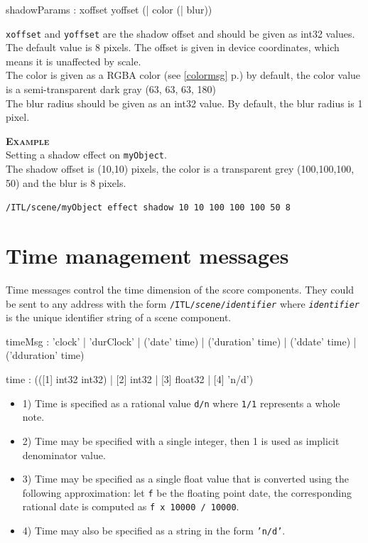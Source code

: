 \documentclass[a4paper,twoside]{report}
\newcommand{\toplevel}[1]	{\chapter{#1}}
\newcommand{\fullref}[1]	{\ref{#1} p.\pageref{#1}}
\newcommand{\OSC}[1]		{\texttt{#1}}
\newcommand{\values}[1]	{\texttt{#1}}
\newcommand{\example}		{\textbf{\hspace{-1.5cm}\textbf{\textsc{Example }}}}
\newcommand{\sample}	[1]			{\vspace{-2mm}\begin{center}\colorbox{mygrey}{
								\begin{minipage}[t]{0.9\columnwidth} 
								{\small \texttt{#1}}
								\end{minipage}}\end{center}}
\begin{document}
\begin{rail}
shadowParams : xoffset yoffset (| color (| blur))
\end{rail}

\OSC{xoffset} and \OSC{yoffset} are the shadow offset and should be given as int32 values. The default value is 8 pixels. The offset is given in device coordinates, which means it is unaffected by scale. \\
The color is given as a RGBA color (see \fullref{colormsg}) by default, the color value is a semi-transparent dark gray (63, 63, 63, 180) \\
The blur radius should be given as an int32 value. By default, the blur radius is 1 pixel.

\example \\
Setting a shadow effect on \OSC{myObject}. \\
The shadow offset is (10,10) pixels, the color is a transparent grey (100,100,100, 50) and the blur is 8 pixels.
\sample{/ITL/scene/myObject effect shadow 10 10 100 100 100 50 8}


\toplevel{Time management messages}
\label{time}
Time messages control the time dimension of the score components. They could be sent to any address with the form \OSC{/ITL/\textit{scene}/\textit{identifier}} where \OSC{\textit{identifier}} is the unique identifier string of a scene component.
\begin{rail}
timeMsg : 'clock'
		| 'durClock' 
		| ('date' time)
		| ('duration' time) 
		| ('ddate' time) 
		| ('dduration' time) 
\end{rail}

\begin{rail}
time : (([1] int32 int32) | [2] int32 | [3] float32 | [4] 'n/d')
\end{rail}

\begin{itemize}
\item 1) Time is specified as a rational value \values{d/n} where \values{1/1} represents a whole note. 
\item 2) Time may be specified with a single integer, then 1 is used as implicit denominator value.
\item 3) Time may be specified as a single float value that is converted using the following approximation: let \values{f} be the floating point date, the corresponding rational date is computed as \values{f x 10000 / 10000}.
\item 4) Time may also be specified as a string in the form \OSC{'n/d'}.
\end{itemize}
\end{document}
